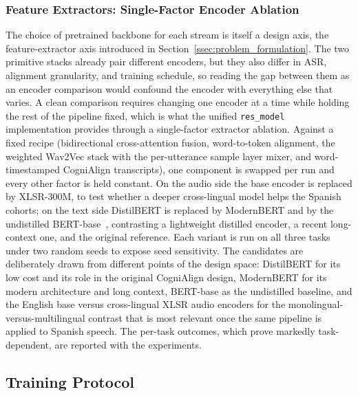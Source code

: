 \documentclass[a4paper,12pt]{article}
\begin{document}
\subsubsection{Feature Extractors: Single-Factor Encoder Ablation}
\label{sssec:feature_extractors}

The choice of pretrained backbone for each stream is itself a design axis, the feature-extractor axis introduced in Section~\ref{ssec:problem_formulation}. The two primitive stacks already pair different encoders, but they also differ in ASR, alignment granularity, and training schedule, so reading the gap between them as an encoder comparison would confound the encoder with everything else that varies. A clean comparison requires changing one encoder at a time while holding the rest of the pipeline fixed, which is what the unified \texttt{res\_model} implementation provides through a single-factor extractor ablation. Against a fixed recipe (bidirectional cross-attention fusion, word-to-token alignment, the weighted Wav2Vec stack with the per-utterance sample layer mixer, and word-timestamped CogniAlign transcripts), one component is swapped per run and every other factor is held constant. On the audio side the base encoder is replaced by XLSR-300M, to test whether a deeper cross-lingual model helps the Spanish cohorts; on the text side DistilBERT is replaced by ModernBERT and by the undistilled BERT-base~\cite{devlin2019bert}, contrasting a lightweight distilled encoder, a recent long-context one, and the original reference. Each variant is run on all three tasks under two random seeds to expose seed sensitivity. The candidates are deliberately drawn from different points of the design space: DistilBERT for its low cost and its role in the original CogniAlign design, ModernBERT for its modern architecture and long context, BERT-base as the undistilled baseline, and the English base versus cross-lingual XLSR audio encoders for the monolingual-versus-multilingual contrast that is most relevant once the same pipeline is applied to Spanish speech. The per-task outcomes, which prove markedly task-dependent, are reported with the experiments.

\subsection{Training Protocol}
\label{ssec:training}
\end{document}
